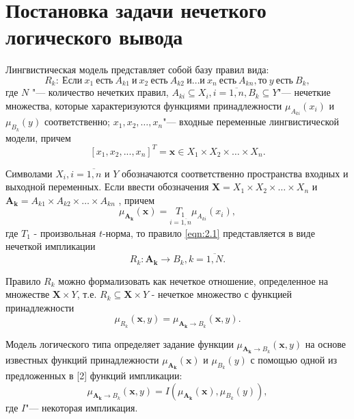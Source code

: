 














\newpage

\section{Постановка задачи нечеткого логического вывода}

Лингвистическая модель представляет собой базу правил вида:
\begin{equation}
	\label{eqn:fuz-problem-1}
	R_k:\ \text{Если}\ x_1\ \text{есть}\ A_{k1}\ \text{и}\ x_2\ \text{есть}\ A_{k2}\ \text{и} \dots \text{и}\ x_n\ \text{есть}\ A_{kn}, \text{то}\ y\ \text{есть}\ B_k,
\end{equation}
где $N$ "--- количество нечетких правил, $A_{ki} \subseteq X_i, i=\overline{1,n}, B_k \subseteq Y$"--- нечеткие множества, которые характеризуются функциями принадлежности $\mu_{A_{ki}}(x_i)$ и $\mu_{B_k}(y)$ соответственно; $x_1, x_2,…,x_n$"--- входные переменные лингвистической модели, причем
\[
[x_1, x_2, ..., x_n]^T = \mathbf{x} \in X_1 \times X_2 \times \dots \times X_n.
\]

Символами  $X_i, i=\overline{1,n}$ и $Y$ обозначаются соответственно пространства входных и выходной переменных. Если ввести обозначения $\mathbf{X}=X_1 \times X_2 \times \dots \times X_n$ и $\mathbf{A_k}=A_{k1}\times A_{k2} \times \dots \times A_{kn}$ , причем
\[
\mu_\mathbf{A_k}(\mathbf{x}) = \underset{i=\overline{1,n}}{T_1} \mu_{A_{ki}}(x_i),
\]
где $T_1$ - произвольная $t$-норма, то правило \ref{eqn:2.1} представляется в виде нечеткой импликации
\begin{equation}
	\label{eqn:fuz-problem-2}
	R_k: \mathbf{A_k} \to B_k, k=\overline{1,N}.
\end{equation}

Правило $R_k$ можно формализовать как нечеткое отношение, определенное на множестве  $\mathbf{X}\times Y$, т.е. $R_k \subseteq \mathbf{X} \times Y$ - нечеткое множество с функцией принадлежности
\[
\mu_{R_k}(\mathbf{x}, y) = \mu_{\mathbf{A_k} \to B_k} (\mathbf{x}, y).
\]

Модель логического типа определяет задание функции $\mu_{\mathbf{A_k} \to B_k} (\mathbf{x}, y)$ на основе известных функций принадлежности $\mu_{\mathbf{A_k}}(\mathbf{x})$ и $\mu_{B_k}(y)$ с помощью одной из предложенных в [2] функций импликации:
\[
\mu_{\mathbf{A_k} \to B_k} (\mathbf{x}, y) = I(\mu_{\mathbf{A_k}}(\mathbf{x}), \mu_{B_k}(y)),
\]
где $I$"--- некоторая импликация.

